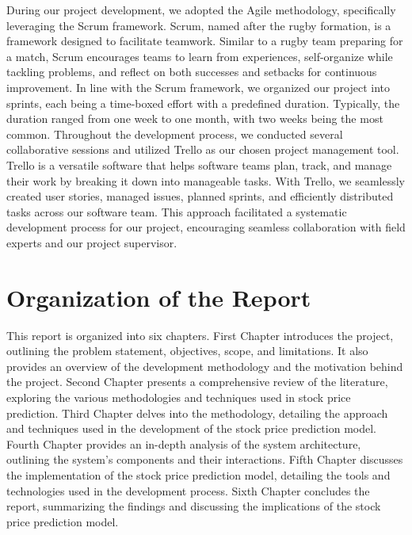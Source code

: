 \documentclass[./main.tex]{subfiles}
\begin{document}
 During our project development, we adopted the Agile methodology, specifically leveraging the Scrum framework. Scrum, named after the rugby formation, is a framework designed to facilitate teamwork. Similar to a rugby team preparing for a match, Scrum encourages teams to learn from experiences, self-organize while tackling problems, and reflect on both successes and setbacks for continuous improvement.
 In line with the Scrum framework, we organized our project into sprints, each being a time-boxed effort with a predefined duration. Typically, the duration ranged from one week to one month, with two weeks being the most common.
 Throughout the development process, we conducted several collaborative sessions and utilized Trello as our chosen project management tool. Trello is a versatile software that helps software teams plan, track, and manage their work by breaking it down into manageable tasks. With Trello, we seamlessly created user stories, managed issues, planned sprints, and efficiently distributed tasks across our software team.
 This approach facilitated a systematic development process for our project, encouraging seamless collaboration with field experts and our project supervisor.
 
 \section{Organization of the Report}
    This report is organized into six chapters.
   \newline \noindent First Chapter introduces the project, outlining the problem statement, objectives, scope, and limitations. It also provides an overview of the development methodology and the motivation behind the project.
   \newline \noindent
   Second Chapter presents a comprehensive review of the literature, exploring the various methodologies and techniques used in stock price prediction.
   \newline \noindent Third Chapter delves into the methodology, detailing the approach and techniques used in the development of the stock price prediction model.
   \newline \noindent Fourth Chapter provides an in-depth analysis of the system architecture, outlining the system's components and their interactions.
    \newline \noindent Fifth Chapter discusses the implementation of the stock price prediction model, detailing the tools and technologies used in the development process.
   \newline \noindent Sixth Chapter concludes the report, summarizing the findings and discussing the implications of the stock price prediction model.
\end{document}
